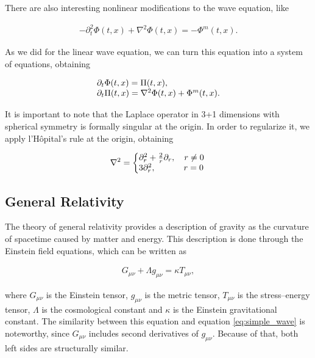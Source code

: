 There are also interesting nonlinear modifications to the wave equation, like 

\begin{align}
    - \partial^2_t \Phi(t,x) + \nabla^2 \Phi(t,x) = - \Phi^m (t,x).
    \label{eq:non_linear_simple_wave}
\end{align}

As we did for the linear wave equation, we can turn this equation into a system of equations, obtaining 

\begin{align}
    \begin{array}{@{}l@{}} 
        \partial_t \Phi(t,x) = \Pi (t,x),
        \\
        \partial_t \Pi(t,x) = \nabla^2 \Phi (t,x) + \Phi^m (t,x).
    \end{array}
    \label{eq:non_linear_simple_wave_system}
\end{align}

It is important to note that the Laplace operator in 3+1 dimensions with spherical symmetry is formally singular at the origin. In order to regularize it, we apply l'Hôpital's rule at the origin, obtaining

\begin{align}
    \nabla^2 = \left\{ 
    \begin{array}{@{}l@{}} 
        \partial_r^2 + \frac{2}{r}\partial_r, \quad r \neq 0
        \\
        3 \partial_r^2, \;\quad\qquad r = 0
    \end{array}
    \right.\, 
    \label{eq:laplace_spherical}
\end{align}

\subsection{General Relativity}
The theory of general relativity provides a description of gravity as the curvature of spacetime caused by matter and energy. This description is done through the Einstein field equations, which can  be written as

\begin{align}
    G_{\mu \nu} + \Lambda g_{\mu \nu} = \kappa T_{\mu \nu},
    \label{eq:Einstein}
\end{align}

\noindent
where $G_{\mu \nu}$ is the Einstein tensor, $g_{\mu \nu}$ is the metric tensor, $T_{\mu \nu}$ is the stress–energy tensor, $\Lambda$ is the cosmological constant and $\kappa$ is the Einstein gravitational constant. The similarity between this equation and equation \eqref{eq:simple_wave} is noteworthy, since $G_{\mu \nu}$ includes second derivatives of $g_{\mu \nu}$. Because of that, both left sides are structurally similar.

